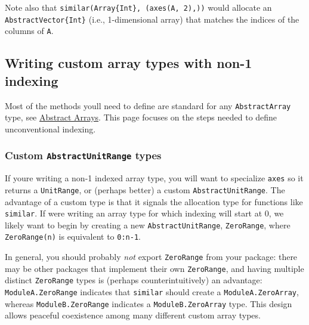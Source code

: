 Note also that \texttt{similar(Array\{Int\}, (axes(A, 2),))} would allocate an \texttt{AbstractVector\{Int\}} (i.e., 1-dimensional array) that matches the indices of the columns of \texttt{A}.



\hypertarget{4699181205936675892}{}


\subsection{Writing custom array types with non-1 indexing}



Most of the methods you{\textquotesingle}ll need to define are standard for any \texttt{AbstractArray} type, see \hyperlink{9718377734213742156}{Abstract Arrays}. This page focuses on the steps needed to define unconventional indexing.



\hypertarget{5924242856598341681}{}


\subsubsection{Custom \texttt{AbstractUnitRange} types}



If you{\textquotesingle}re writing a non-1 indexed array type, you will want to specialize \texttt{axes} so it returns a \texttt{UnitRange}, or (perhaps better) a custom \texttt{AbstractUnitRange}.  The advantage of a custom type is that it {\textquotedbl}signals{\textquotedbl} the allocation type for functions like \texttt{similar}. If we{\textquotesingle}re writing an array type for which indexing will start at 0, we likely want to begin by creating a new \texttt{AbstractUnitRange}, \texttt{ZeroRange}, where \texttt{ZeroRange(n)} is equivalent to \texttt{0:n-1}.



In general, you should probably \emph{not} export \texttt{ZeroRange} from your package: there may be other packages that implement their own \texttt{ZeroRange}, and having multiple distinct \texttt{ZeroRange} types is (perhaps counterintuitively) an advantage: \texttt{ModuleA.ZeroRange} indicates that \texttt{similar} should create a \texttt{ModuleA.ZeroArray}, whereas \texttt{ModuleB.ZeroRange} indicates a \texttt{ModuleB.ZeroArray} type.  This design allows peaceful coexistence among many different custom array types.



